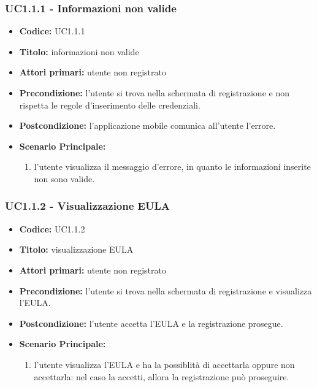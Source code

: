 \documentclass[casi-duso]{subfiles}
\begin{document}
\subsubsection{UC1.1.1 - Informazioni non valide}
\label{sub:uc1.1.1utente}
\begin{itemize}
  \item \textbf{Codice:} UC1.1.1
  \item \textbf{Titolo:} informazioni non valide
  \item \textbf{Attori primari:} utente non registrato
  \item \textbf{Precondizione:} l'utente si trova nella schermata di registrazione e non rispetta le regole d'inserimento delle credenziali.
  \item \textbf{Postcondizione:} l'applicazione mobile comunica all'utente l'errore.
  \item \textbf{Scenario Principale:} 
  \begin{enumerate}
    \item l'utente visualizza il messaggio d'errore, in quanto le informazioni inserite non sono valide.
  \end{enumerate}
\end{itemize}

\subsubsection{UC1.1.2 - Visualizzazione EULA}
\label{sub:uc1.1.2utente}
\begin{itemize}
  \item \textbf{Codice:} UC1.1.2
  \item \textbf{Titolo:} visualizzazione EULA
  \item \textbf{Attori primari:} utente non registrato
  \item \textbf{Precondizione:} l'utente si trova nella schermata di registrazione e visualizza l'EULA\@.
  \item \textbf{Postcondizione:} l'utente accetta l'EULA e la registrazione prosegue.
  \item \textbf{Scenario Principale:}
  \begin{enumerate}
    \item l'utente visualizza l'EULA e ha la possiblità di accettarla oppure non accettarla: nel caso la accetti, allora la registrazione può proseguire.
  \end{enumerate}
\end{itemize}
\end{document}
